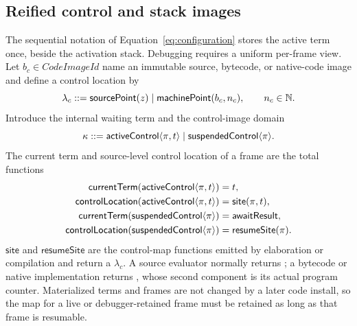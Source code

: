 \subsection{Reified control and stack images}
\label{sec:debugging}

The sequential notation of Equation~\eqref{eq:configuration} stores the active
term once, beside the activation stack.  Debugging requires a uniform
per-frame view.  Let $b_c\in\mathit{CodeImageId}$ name an immutable source,
bytecode, or native-code image and define a control location by
\begin{equation}\label{eq:control-location-domain}
 \lambda_c::=\mathsf{sourcePoint}(z)\mid
   \mathsf{machinePoint}(b_c,n_c),\qquad n_c\in\mathbb N.
\end{equation}
Introduce the internal waiting term  and the control-image
domain
\begin{equation}\label{eq:frame-control-domain}
 \kappa::=\mathsf{activeControl}\langle\pi,t\rangle
       \mid\mathsf{suspendedControl}\langle\pi\rangle.
\end{equation}
The current term and source-level control location of a frame are the total
functions
\begin{equation}\label{eq:frame-current-term-and-location}
\begin{aligned}
 \mathsf{currentTerm}(\mathsf{activeControl}\langle\pi,t\rangle)&=t,\\
 \mathsf{controlLocation}(\mathsf{activeControl}\langle\pi,t\rangle)
   &=\mathsf{site}(\pi,t),\\
 \mathsf{currentTerm}(\mathsf{suspendedControl}\langle\pi\rangle)
   &=\mathsf{awaitResult},\\
 \mathsf{controlLocation}(\mathsf{suspendedControl}\langle\pi\rangle)
   &=\mathsf{resumeSite}(\pi).
\end{aligned}
\end{equation}
$\mathsf{site}$ and $\mathsf{resumeSite}$ are the control-map functions emitted
by elaboration or compilation and return a $\lambda_c$.  A source evaluator
normally returns ; a bytecode or native implementation returns
, whose second component is its actual program counter.
Materialized terms and frames are not changed by a later code
install, so the map for a live or debugger-retained frame must be retained as
long as that frame is resumable.

